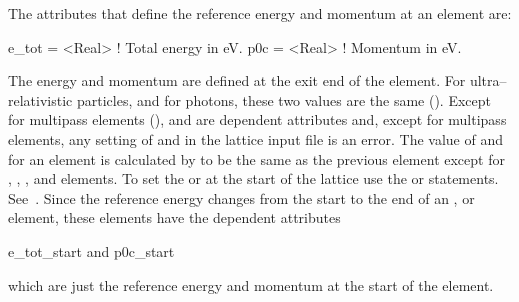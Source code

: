 The attributes that define the reference energy and momentum at an element are:
\begin{example}
  e_tot  = <Real>  ! Total energy in eV.
  p0c    = <Real>  ! Momentum in eV.
\end{example}
The energy and momentum are defined at the exit end of the element.  For ultra--relativistic
particles, and for photons, these two values are the same (). Except for
multipass elements (),  and  are dependent attributes and,
except for multipass elements, any setting of  and  in the lattice input file is
an error. The value of  and  for an element is calculated by \bmad to be the same
as the previous element except for , , , and 
elements. To set the  or  at the start of the lattice use the  or
 statements.  See~. Since the reference energy changes from the start to
the end of an ,  or  element, these elements have the
dependent attributes
\begin{example}
  e_tot_start   and
  p0c_start
\end{example}
which are just the reference energy and momentum at the start of the element.


